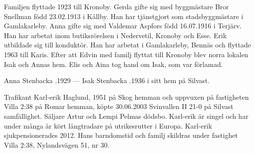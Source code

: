\begin{jhchildren}
  \item {}
  \item {}
  \item {}
  \item {}
\end{jhchildren}
Familjen flyttade 1923 till Kronoby.
Gerda gifte sig med byggmästare Bror Snellman född 23.02.1913 i Kållby. Han har tjänstgjort som stadsbyggmästare i Gamlakarleby. Anna gifte sig med Valdemar Aspfors född 16.07.1916 i Terjärv. Han har arbetat inom butiksrörelsen i Nedervetil, Kronoby och Esse. Erik utbildade sig till konduktör. Han har arbetat i Gamlakarleby, Bennäs och flyttade 1963 till Karis. Efter att Edvin med familj flyttat till Kronoby blev norra lokalen Isak och Annas hem. Elis och Aina tog hand om Isak, som var förlamad.

Anna Stenbacka .1929  ---  Isak Stenbacka .1936 i sitt hem på Silvast.






Trafikant Karl-erik Haglund,  1951 på Skog hemman och uppvuxen på fastigheten Villa 2:38 på Romar hemman, köpte 30.06.2003 Svinvallen II 21-0 på Silvast samfällighet. Säljare Artur och Lempi Pelmas dödsbo. Karl-erik är singel och har under många år kört långtradare på utrikesrutter i Europa. Karl-erik sjukpensionerades 2012. Hans barndomstid och familj skildras under fastighet Villa 2:38, Nylandsvägen 51, nr 30.


